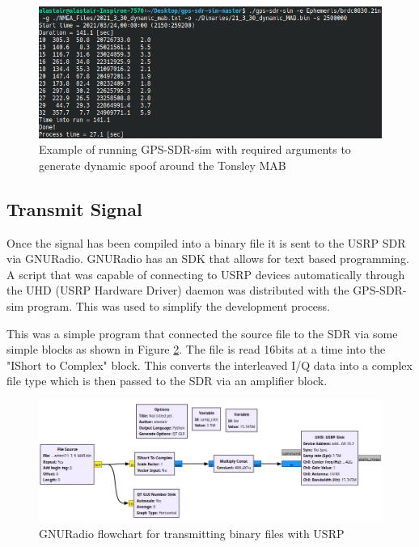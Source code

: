 \begin{figure}[!ht]
    \begin{centering}
        \includegraphics[width=14cm,keepaspectratio]{Figures/gps-sdr-sim running.png}
        \caption{Example of running GPS-SDR-sim with required arguments to generate dynamic spoof around the Tonsley MAB}
    \label{fig:sdrsimexample}
    \end{centering}
\end{figure}

\subsection{Transmit Signal}
Once the signal has been compiled into a binary file it is sent to the USRP SDR via GNURadio. GNURadio has an SDK that allows for text based programming. A script that was
capable of connecting to USRP devices automatically through the UHD (USRP Hardware Driver) daemon was distributed with the GPS-SDR-sim program. This was used to simplify the development
process. 

This was a simple program that connected the source file to the SDR via some simple blocks as shown in Figure \ref{fig:GNURadioSpoof}. The file is read 16bits at a time
into the "IShort to Complex" block. This converts the interleaved I/Q data into a complex file type which is then passed to the SDR via an amplifier block.

\begin{figure}[!ht]
    \begin{centering}
        \includegraphics[width=14cm,keepaspectratio]{Figures/GNURadio_Spoofer.png}
        \caption{GNURadio flowchart for transmitting binary files with USRP}
    \label{fig:GNURadioSpoof}
    \end{centering}
\end{figure}

